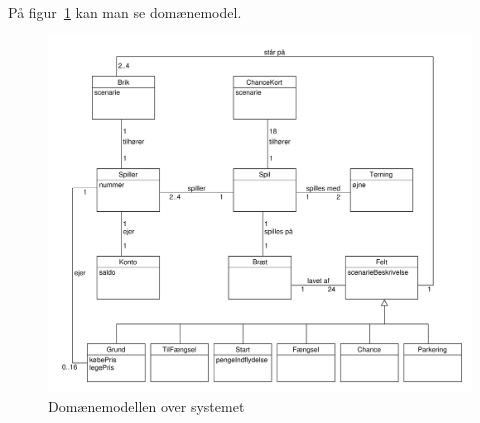 \documentclass[class=article, crop=false]{standalone}
\begin{document}
    På figur~\ref{fig:domain_model} kan man se domænemodel.

            \begin{figure}[H]
                \centering

                \includegraphics[scale=0.3]{diagrams_png/domain_model.pdf}
                \caption{Domænemodellen over systemet}\label{fig:domain_model}
            \end{figure}
\end{document}
